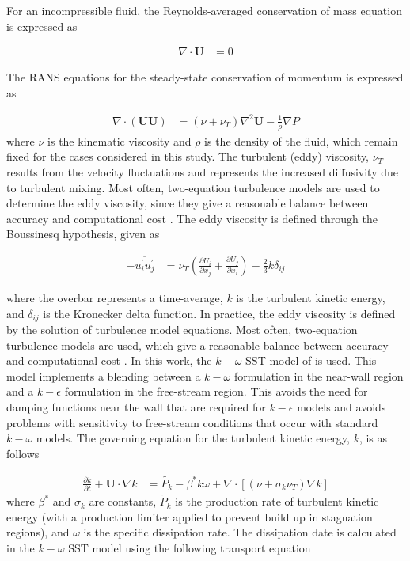 For an incompressible fluid, the Reynolds-averaged conservation of mass equation is expressed as

\begin{align}
\nabla \cdot \mathbf{U} &= 0
\end{align}

The RANS equations for the steady-state conservation of momentum is expressed as 

\begin{align}
\nabla \cdot (\mathbf{UU}) &= \left(\nu + \nu_T\right) \nabla ^2 \mathbf{U} - \frac{1}{\rho} \nabla P 
\end{align}
% 
where $\nu$ is the kinematic viscosity and $\rho$ is the density of the fluid, which remain fixed for the cases considered in this study. The turbulent (eddy) viscosity, $\nu_T$ results from the velocity fluctuations and represents the increased diffusivity due to turbulent mixing. Most often, two-equation turbulence models are used to determine the eddy viscosity, since they give a reasonable balance between accuracy and computational cost \cite{versteeg1995}.
\skippingparagraph
The eddy viscosity is defined through the Boussinesq hypothesis, given as 

\begin{align}
-\overline{u_i^\prime u_j^\prime}
&= \nu_T \left(\frac{\partial U_i}{\partial x_j} + \frac{\partial U_j}{\partial x_i} \right) - \frac{2}{3}k\delta_{ij}
\end{align}

where the overbar represents a time-average, $k$ is the turbulent kinetic energy, and $\delta_{ij}$ is the Kronecker delta function. In practice, the eddy viscosity is defined by the solution of turbulence model equations. Most often, two-equation turbulence models are used, which give a reasonable balance between accuracy and computational cost \cite{versteeg1995}. 
\skippingparagraph
In this work, the $k-\omega$ SST model of \cite{menter1994} is used. This model implements a blending between a $k-\omega$ formulation in the near-wall region and a $k-\epsilon$ formulation in the free-stream region. This avoids the need for damping functions near the wall that are required for $k-\epsilon$ models and avoids problems with sensitivity to free-stream conditions that occur with standard $k-\omega$ models.
\skippingparagraph
The governing equation for the turbulent kinetic energy, $k$, is as follows \cite{menter1994}

\begin{align}
\frac{\partial k}{\partial t} + \mathbf{U}  \cdot \nabla  k &= \tilde{P_k} - \beta^*k\omega + \nabla \cdot \left[(\nu + \sigma_k \nu_T)\nabla k \right]
\label{eq:k}
\end{align}
%
where $\beta^*$ and $\sigma_k$ are constants, $\tilde{P_k}$ is the production rate of turbulent kinetic energy (with a production limiter applied to prevent build up in stagnation regions), and $\omega$ is the specific dissipation rate. The dissipation date is calculated in the $k-\omega$ SST model using the following transport equation \cite{menter1994}

